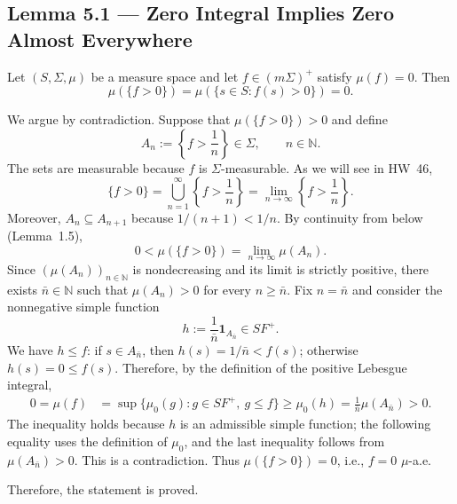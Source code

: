 \subsection*{Lemma 5.1 --- Zero Integral Implies Zero Almost Everywhere}%
%

 Let $(S,\Sigma,\mu)$ be a measure space and let
$f\in(m\Sigma)^+$ satisfy $\mu(f)=0$. Then
\[
\mu(\{f>0\})=\mu(\{s\in S:f(s)>0\})=0.
\]

\par\noindent{}\par\nobreak

We argue by contradiction. Suppose that $\mu(\{f>0\})>0$ and define
\[
A_n:=\left\{f>\frac1n\right\}\in\Sigma,\qquad n\in\mathbb N.
\]
The sets are measurable because $f$ is $\Sigma$-measurable. As we will see in
HW~46,
\[
\{f>0\}
=\bigcup_{n=1}^{\infty}\left\{f>\frac1n\right\}
=\lim_{n\to\infty}\left\{f>\frac1n\right\}.
\]
Moreover, $A_n\subseteq A_{n+1}$ because $1/(n+1)<1/n$. By continuity
from below (Lemma~1.5),
\[
0<\mu(\{f>0\})=\lim_{n\to\infty}\mu(A_n).
\]
Since $(\mu(A_n))_{n\in\mathbb N}$ is nondecreasing and its limit is
strictly positive, there exists $\bar n\in\mathbb N$ such that
$\mu(A_n)>0$ for every $n\ge\bar n$. Fix $n=\bar n$ and consider the
nonnegative simple function
\[
h:=\frac1{\bar n}\mathbf1_{A_{\bar n}}\in SF^+.
\]
We have $h\le f$: if $s\in A_{\bar n}$, then
$h(s)=1/\bar n<f(s)$; otherwise $h(s)=0\le f(s)$.
Therefore, by the definition of the positive Lebesgue integral,
\[
\begin{aligned}
0=\mu(f)&=\sup\{\mu_0(g):g\in SF^+,\ g\le f\} \ge\mu_0(h)
=\frac1{\bar n}\mu(A_{\bar n})>0.
\end{aligned}
\]
The inequality holds because $h$ is an admissible simple function; the
following equality uses the definition of $\mu_0$, and the last inequality
follows from $\mu(A_{\bar n})>0$. This is a contradiction. Thus
$\mu(\{f>0\})=0$, i.e., $f=0$ $\mu$-a.e.

Therefore, the statement is proved.
